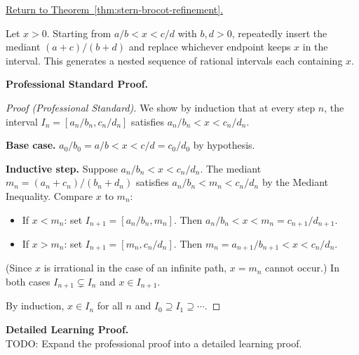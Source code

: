 
\newpage
{}
\label{prf:stern-brocot-refinement}

\begin{remark*}[Return]
\hyperref[thm:stern-brocot-refinement]{Return to Theorem~\ref*{thm:stern-brocot-refinement}.}
\end{remark*}

\begin{theorem*}
Let $x > 0$.  Starting from $a/b < x < c/d$ with $b,d > 0$, repeatedly
insert the mediant $(a+c)/(b+d)$ and replace whichever endpoint keeps $x$
in the interval.  This generates a nested sequence of rational intervals
each containing $x$.
\end{theorem*}

\textbf{Professional Standard Proof.}~\\
\begin{proof}
[Proof (Professional Standard)]
We show by induction that at every step $n$, the interval
$I_n = [a_n/b_n, c_n/d_n]$ satisfies $a_n/b_n < x < c_n/d_n$.

\textbf{Base case.} $a_0/b_0 = a/b < x < c/d = c_0/d_0$ by hypothesis.

\textbf{Inductive step.} Suppose $a_n/b_n < x < c_n/d_n$.  The mediant
$m_n = (a_n + c_n)/(b_n + d_n)$ satisfies $a_n/b_n < m_n < c_n/d_n$ by the
Mediant Inequality.  Compare $x$ to $m_n$:
\begin{itemize}
  \item If $x < m_n$: set $I_{n+1} = [a_n/b_n, m_n]$.  Then
        $a_n/b_n < x < m_n = c_{n+1}/d_{n+1}$.
  \item If $x > m_n$: set $I_{n+1} = [m_n, c_n/d_n]$.  Then
        $m_n = a_{n+1}/b_{n+1} < x < c_n/d_n$.
\end{itemize}
(Since $x$ is irrational in the case of an infinite path, $x = m_n$
cannot occur.)  In both cases $I_{n+1} \subsetneq I_n$ and $x \in I_{n+1}$.

By induction, $x \in I_n$ for all $n$ and $I_0 \supseteq I_1 \supseteq \cdots$.
\end{proof}

\textbf{Detailed Learning Proof.}~\\
TODO: Expand the professional proof into a detailed learning proof.


